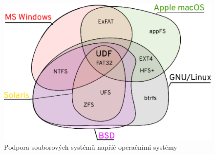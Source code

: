 \begin{figure}[hb] 
    \centering
    \includegraphics[scale=0.82]{obrazky/udf-podpora.eps}
    \caption{Podpora souborových systémů napříč operačními systémy}
    \label{fig:udf-podpora}
\end{figure}

